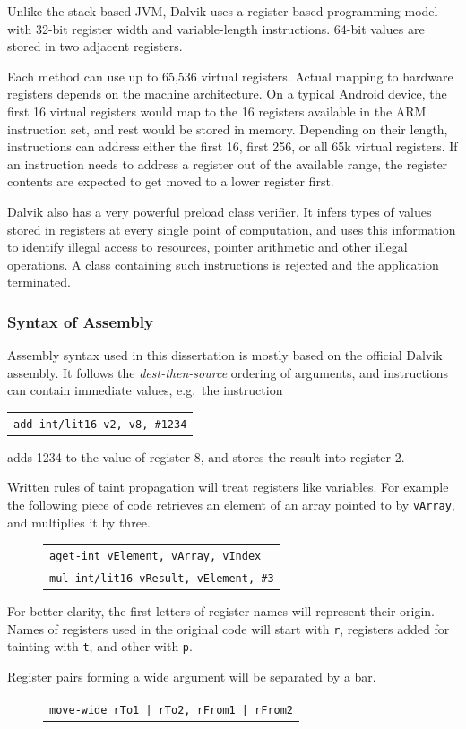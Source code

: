 \documentclass[12pt,twoside,notitlepage]{report}
\newcommand{\centerbox}[1] {
	\begin{center}
	\begin{footnotesize}
	\begin{tabular}{l}
		#1
	\end{tabular}
	\end{footnotesize}
	\end{center}
}
\newcommand{\asm}[1] {\texttt{#1}}
\begin{document}
Unlike the stack-based JVM, Dalvik uses a register-based programming model with 32-bit register width and variable-length instructions. 64-bit values are stored in two adjacent registers.

Each method can use up to 65,536 virtual registers. Actual mapping to hardware registers depends on the machine architecture. On a typical Android device, the first 16 virtual registers would map to the 16 registers available in the ARM instruction set, and rest would be stored in memory. Depending on their length, instructions can address either the first 16, first 256, or all 65k virtual registers. If an instruction needs to address a register out of the available range, the register contents are expected to get moved to a lower register first.

Dalvik also has a very powerful preload class verifier. It infers types of values stored in registers at every single point of computation, and uses this information to identify illegal access to resources, pointer arithmetic and other illegal operations. A class containing such instructions is rejected and the application terminated.

\subsubsection{Syntax of Assembly}
Assembly syntax used in this dissertation is mostly based on the official Dalvik assembly. It follows the \emph{dest-then-source} ordering of arguments, and instructions can contain immediate values, e.g.\ the instruction
		\centerbox{
			\asm{add-int/lit16 v2, v8, \#1234}
		}
adds 1234 to the value of register 8, and stores the result into register 2. 

Written rules of taint propagation will treat registers like variables. For example the following piece of code retrieves an element of an array pointed to by \verb$vArray$, and multiplies it by three.
	\begin{figure}[H]
		\centerbox{
			\asm{aget-int vElement, vArray, vIndex} \\
			\asm{mul-int/lit16 vResult, vElement, \#3}
		}
	\end{figure}

For better clarity, the first letters of register names will represent their origin. Names of registers used in the original code will start with \verb$r$, registers added for tainting with \verb$t$, and other with \verb$p$.

Register pairs forming a wide argument will be separated by a bar.
	\begin{figure}[H]
		\centerbox{
			\asm{move-wide rTo1 | rTo2, rFrom1 | rFrom2}
		}
	\end{figure}
\end{document}
